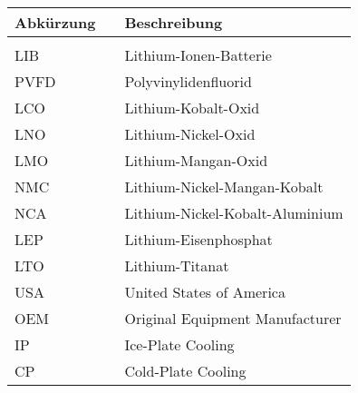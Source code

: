 \vspace{1cm}
\\
\hspace*{0.8cm}
\begin{tabularx}{15.1cm}{lll}
	\textbf{Abkürzung} & \hspace{1.95cm} & \textbf{Beschreibung} \\ %
	\hline \\ [-0.2cm]
	LIB & & Lithium-Ionen-Batterie\\ [0.1cm]
	PVFD & & Polyvinylidenfluorid\\ [0.1cm]
	LCO & & Lithium-Kobalt-Oxid\\ [0.1cm]
	LNO & & Lithium-Nickel-Oxid\\ [0.1cm]
	LMO & & Lithium-Mangan-Oxid\\ [0.1cm]
	NMC & & Lithium-Nickel-Mangan-Kobalt\\ [0.1cm]
	NCA & & Lithium-Nickel-Kobalt-Aluminium\\ [0.1cm]
	LEP & & Lithium-Eisenphosphat\\ [0.1cm]
	LTO & & Lithium-Titanat\\ [0.1cm]
	USA & & United States of America\\ [0.1cm]
	OEM & & Original Equipment Manufacturer\\ [0.1cm]
	IP & & Ice-Plate Cooling\\ [0.1cm]
	CP & & Cold-Plate Cooling\\ [0.1cm]
\end{tabularx}




